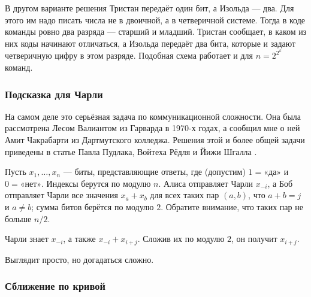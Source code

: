 \begin{addedbytheeditors}
В другом варианте решения Тристан передаёт один бит, а Изольда --- два.
Для этого им надо писать числа не в двоичной, а в четверичной системе.
Тогда в коде команды ровно два разряда --- старший и младший.
Тристан сообщает, в каком из них коды начинают отличаться, а Изольда передаёт два бита, которые и задают четверичную цифру в этом разряде.
Подобная схема работает и для $n = 2^{2^k}$ команд.
\pr
%
%
\end{addedbytheeditors}

\subsubsection*{Подсказка для Чарли}

На самом деле это серьёзная задача по коммуникационной сложности.
Она была рассмотрена Лесом Валиантом из Гарварда в 1970-х годах,
а сообщил мне о ней Амит Чакрабарти из Дартмутского колледжа.
Решения этой и более общей задачи приведены в статье Павла Пудлака, Войтеха Рёдля и Йижи Шгалла \cite{49}.

Пусть $x_1, \dots , x_n$ --- биты, представляющие ответы, где (допустим) $1 = \text{«да»}$ и $0 = \text{«нет»}$.
Индексы берутся по модулю $n$.
Алиса отправляет Чарли $x_{-i}$,
а Боб отправляет Чарли все значения $x_a + x_b$ для всех таких пар $(a, b)$, что $a + b = j$ и $a\ne b$;
сумма битов берётся по модулю $2$.
Обратите внимание, что таких пар не больше $n/2$.

Чарли знает $x_{-i}$, а также $x_{-i} + x_{i+j}$. Сложив их по модулю $2$, он получит $x_{i+j}$.

Выглядит просто, но догадаться сложно.


\subsubsection*{Сближение по кривой}

